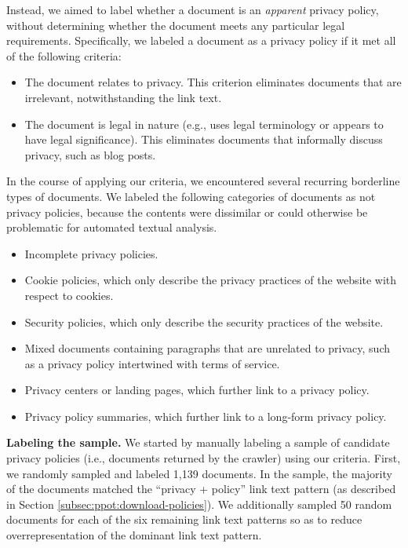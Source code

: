 Instead, we aimed to label whether a document is an \textit{apparent} privacy policy, without determining whether the document meets any particular legal requirements. Specifically, we labeled a document as a privacy policy if it met all of the following criteria:
\begin{itemize}
    \item The document relates to privacy. This criterion eliminates documents that are irrelevant, notwithstanding the link text.
    \item The document is legal in nature (e.g., uses legal terminology or appears to have legal significance). This eliminates documents that informally discuss privacy, such as blog posts.
\end{itemize}
In the course of applying our criteria, we encountered several recurring borderline types of documents. We labeled the following categories of documents as not privacy policies, because the contents were dissimilar or could otherwise be problematic for automated textual analysis.
\begin{itemize}
\item Incomplete privacy policies.

\item Cookie policies, which only describe the privacy practices of the website with respect to cookies.

\item Security policies, which only describe the security practices of the website.

\item Mixed documents containing paragraphs that are unrelated to privacy, such as a privacy policy intertwined with terms of service.

\item Privacy centers or landing pages, which further link to a privacy policy.

\item Privacy policy summaries, which further link to a long-form privacy policy.

\end{itemize}

\textbf{Labeling the sample.} We started by manually labeling a sample of candidate privacy policies (i.e., documents returned by the crawler) using our criteria. First, we randomly sampled and labeled 1,139 documents. In the sample, the majority of the documents 
matched the ``privacy + policy'' link text pattern (as described in Section \ref{subsec:ppot:download-policies}). We additionally sampled 50 random documents for each of the six remaining link text patterns so as to reduce overrepresentation of the 
dominant
link text pattern.

